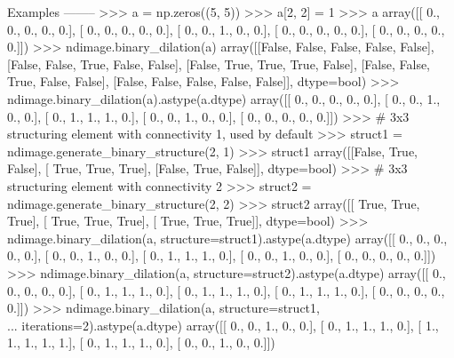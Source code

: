 \begin{DoxyVerb}
Examples
--------
>>> a = np.zeros((5, 5))
>>> a[2, 2] = 1
>>> a
array([[ 0.,  0.,  0.,  0.,  0.],
       [ 0.,  0.,  0.,  0.,  0.],
       [ 0.,  0.,  1.,  0.,  0.],
       [ 0.,  0.,  0.,  0.,  0.],
       [ 0.,  0.,  0.,  0.,  0.]])
>>> ndimage.binary_dilation(a)
array([[False, False, False, False, False],
       [False, False,  True, False, False],
       [False,  True,  True,  True, False],
       [False, False,  True, False, False],
       [False, False, False, False, False]], dtype=bool)
>>> ndimage.binary_dilation(a).astype(a.dtype)
array([[ 0.,  0.,  0.,  0.,  0.],
       [ 0.,  0.,  1.,  0.,  0.],
       [ 0.,  1.,  1.,  1.,  0.],
       [ 0.,  0.,  1.,  0.,  0.],
       [ 0.,  0.,  0.,  0.,  0.]])
>>> # 3x3 structuring element with connectivity 1, used by default
>>> struct1 = ndimage.generate_binary_structure(2, 1)
>>> struct1
array([[False,  True, False],
       [ True,  True,  True],
       [False,  True, False]], dtype=bool)
>>> # 3x3 structuring element with connectivity 2
>>> struct2 = ndimage.generate_binary_structure(2, 2)
>>> struct2
array([[ True,  True,  True],
       [ True,  True,  True],
       [ True,  True,  True]], dtype=bool)
>>> ndimage.binary_dilation(a, structure=struct1).astype(a.dtype)
array([[ 0.,  0.,  0.,  0.,  0.],
       [ 0.,  0.,  1.,  0.,  0.],
       [ 0.,  1.,  1.,  1.,  0.],
       [ 0.,  0.,  1.,  0.,  0.],
       [ 0.,  0.,  0.,  0.,  0.]])
>>> ndimage.binary_dilation(a, structure=struct2).astype(a.dtype)
array([[ 0.,  0.,  0.,  0.,  0.],
       [ 0.,  1.,  1.,  1.,  0.],
       [ 0.,  1.,  1.,  1.,  0.],
       [ 0.,  1.,  1.,  1.,  0.],
       [ 0.,  0.,  0.,  0.,  0.]])
>>> ndimage.binary_dilation(a, structure=struct1,\\
... iterations=2).astype(a.dtype)
array([[ 0.,  0.,  1.,  0.,  0.],
       [ 0.,  1.,  1.,  1.,  0.],
       [ 1.,  1.,  1.,  1.,  1.],
       [ 0.,  1.,  1.,  1.,  0.],
       [ 0.,  0.,  1.,  0.,  0.]])\end{DoxyVerb}
 \hypertarget{namespacescipy_1_1ndimage_1_1morphology_ae73c8293c1bd5bfea8af1bf3af3628a7}{}
